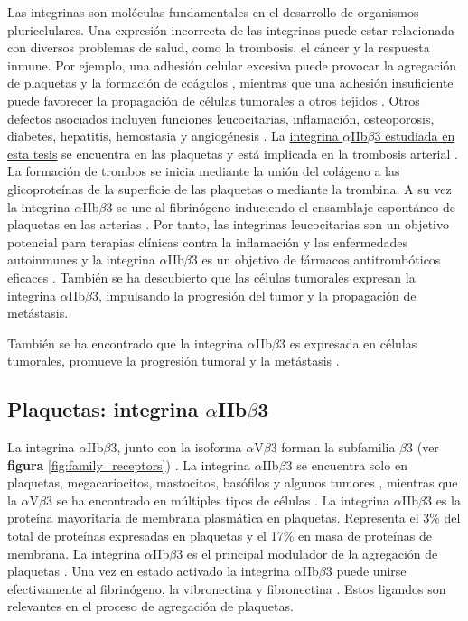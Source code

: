 Las integrinas son moléculas fundamentales en el desarrollo de organismos pluricelulares. Una expresión incorrecta de las integrinas puede estar relacionada con diversos problemas de salud, como la trombosis, el cáncer y la respuesta inmune. Por ejemplo, una adhesión celular excesiva puede provocar la agregación de plaquetas y la formación de coágulos  \citep{Chen1992, Chung1997, Plow1999}, mientras que una adhesión insuficiente puede favorecer la propagación de células tumorales a otros tejidos \citep{Avraamides2008, Guo2004, Hood2002}.
 Otros defectos asociados incluyen funciones leucocitarias, inflamación, osteoporosis, diabetes, hepatitis, hemostasia y angiogénesis \citep{Eliceiri1998,Mousa2000,Ruegg2003}. La \underline{integrina $\alpha$IIb$\beta$3 estudiada en esta tesis} se encuentra en las plaquetas y está implicada en la trombosis arterial \citep{Huang2019,Moser2008,Smyth2001}. 
La formación de trombos se inicia mediante la unión del colágeno a las glicoproteínas de la superficie de las plaquetas o mediante la trombina. A su vez la integrina $\alpha$IIb$\beta$3 se une al fibrinógeno induciendo el ensamblaje espontáneo de plaquetas en las arterias \citep{Moser2008, Huang2019}. Por tanto, las integrinas leucocitarias son un objetivo potencial para terapias clínicas contra la inflamación y las enfermedades autoinmunes y la integrina $\alpha$IIb$\beta$3 es un objetivo de fármacos antitrombóticos eficaces \citep{Cox2010, Desgrosellier2010, Steglich2015, Zhang2019}. También se ha descubierto que las células tumorales expresan la integrina $\alpha$IIb$\beta$3, impulsando la progresión del tumor y la propagación de metástasis.

También se ha encontrado que la integrina $\alpha$IIb$\beta$3 es expresada en células tumorales, promueve la progresión tumoral y la metástasis \citep{Chopra1992}. %

\subsection{Plaquetas: integrina $\alpha$IIb$\beta$3}
La integrina $\alpha$IIb$\beta$3, junto con la isoforma $\alpha$\small{V}$\beta$3 forman la subfamilia $\beta$3 (ver \textbf{figura} \ref{fig:family_receptors}) \citep{Bledzka2012}. La integrina $\alpha$IIb$\beta$3 se encuentra solo en plaquetas, megacariocitos, mastocitos, basófilos y algunos tumores \citep{Chen1997, Pabla1999}, mientras que la $\alpha$\small{V}$\beta$3 se ha encontrado en múltiples tipos de células \citep{Beer2012, Cayrol2015}. La integrina $\alpha$IIb$\beta$3  es la proteína mayoritaria de membrana plasmática en plaquetas. Representa el 3\% del total de proteínas expresadas en plaquetas y el 17\% en masa de proteínas de membrana. La integrina $\alpha$IIb$\beta$3 es el principal modulador de la agregación de plaquetas \citep{Huang2019}. Una vez en estado activado la integrina $\alpha$IIb$\beta$3 puede unirse efectivamente al fibrinógeno, la vibronectina y fibronectina \citep{Mosesson2005, Ugarova2001}. Estos ligandos son relevantes en el proceso de agregación de plaquetas. 

